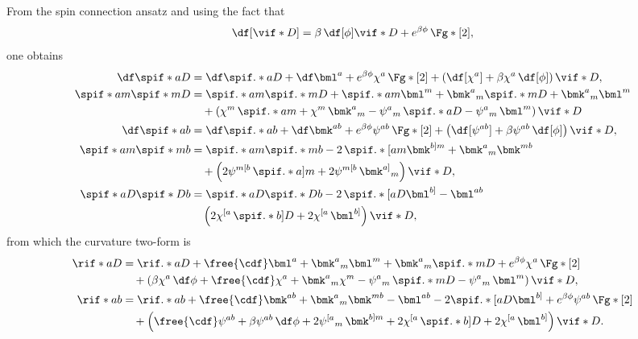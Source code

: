 From the spin connection ansatz and using the fact that
\begin{equation}
  \df[\vif*{D}] = \beta \, \df[\phi] \vif*{D} + e^{\beta \phi} \, \Fg*[2],
\end{equation}
one obtains
\begin{align}
  \df \spif*{a D}{}
  &= \df \spif.*{a D}{} + \df \bml^a + e^{\beta \phi} \chi^a \, \Fg*[2] + \left( \df[\chi^a] + \beta \chi^a \, \df[\phi] \right) \vif*{D}, \\
  \spif*{a}{m}  \spif*{m D}{}
  &= \spif.*{a}{m} \spif.*{m D}{} + \spif.*{a}{m} \bml^m + \bmk^a{}_m \spif.*{m D}{} + \bmk^{a}{}_m \bml^m \\
  & \quad + \left( \chi^m \, \spif.*{a}{m} + \chi^m \, \bmk^a{}_m - \psi^a{}_m  \, \spif.*{a}{D} - \psi^a{}_m  \, \bml^m \right) \vif*{D} \notag \\
  \df \spif*{a b}{}
  &= \df \spif.*{a b}{} + \df \bmk^{ab} + e^{\beta \phi} \psi^{ab} \, \Fg*[2] + \left( \df[\psi^{ab}] + \beta \psi^{ab} \, \df[\phi] \right) \vif*{D} ,\\
  \spif*{a}{m} \spif*{m}{b}
  &= \spif.*{a}{m} \spif.*{m}{b} - 2 \, \spif.*{[a}{m} \bmk^{b]m} + \bmk^a{}_m \bmk^{mb} \\
  & \quad + \left( 2 \psi^{m[b} \, \spif.*{a]}{m} + 2 \psi^{m[b} \, \bmk^{a]}{}_{m} \right) \vif*{D}, \notag \\
  \spif*{a}{D} \spif*{D}{b}
  &= \spif.*{a}{D} \spif.*{D}{b} - 2 \, \spif.*{[a}{D} \bml^{b]} - \bml^{ab} \\
  & \quad \left( 2 \chi^{[a} \, \spif.*{b]}{D} + 2 \chi^{[a} \, \bml^{b]} \right) \vif*{D}, \notag
\end{align}
from which the curvature two-form is
\begin{align}
  \rif*{a D}{} &= \rif.*{a D}{} + \free{\cdf} \bml^a + \bmk^{a}{}_m \bml^m + \bmk^{a}{}_m \spif.*{m D}{} + e^{\beta \phi} \chi^a \, \Fg*[2] \\
  & \quad + \left( \beta \chi^a \, \df\phi + \free{\cdf} \chi^a + \bmk^a{}_m \chi^m - \psi^a{}_m \, \spif.*{m D}{} - \psi^a{}_m \, \bml^m \right) \vif*{D}, \notag \\
  \rif*{a b}{} &= \rif.*{a b}{} + \free{\cdf}\bmk^{ab} + \bmk^a{}_m \bmk^{mb} - \bml^{ab} - 2 \spif.*{[a}{D} \bml^{b]} + e^{\beta \phi} \psi^{ab} \, \Fg*[2] \\
  & \quad + \left( \free{\cdf}\psi^{ab} + \beta \psi^{ab} \, \df \phi + 2 \psi^{[a}{}_m \, \bmk^{b] m} + 2 \chi^{[a} \, \spif.*{b] D}{} + 2 \chi^{[a} \, \bml^{b]} \right) \vif*{D} . \notag
\end{align}


\nocite{German:1993bq,Aros:2007nn}
\nocite{MuellerHoissen:1989yv,Mardones:1990qc}
